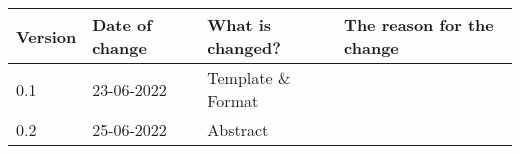 \begin{tabular}{ | l | l | l | l |}
    \hline
    \textbf{Version} & \textbf{Date of change} & \textbf{What is changed?} & \textbf{The reason for the change} \\ \hline
    0.1 & 23-06-2022 & Template \& Format  & \\
    0.2 & 25-06-2022 & Abstract & \\
    
    \hline
\end{tabular}
